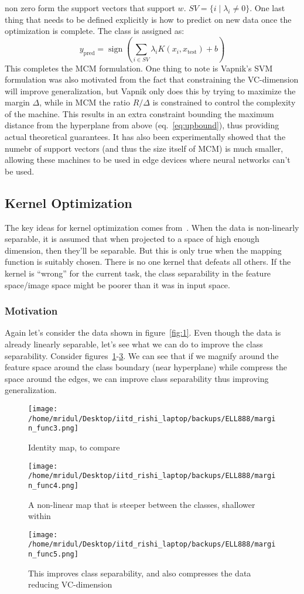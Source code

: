 \documentclass[11pt]{article}
\begin{document}
non zero form the support vectors that support $w$.
$SV=\{i\;\lvert\;\lambda_i\ne 0\}$. One last
thing that needs to be defined explicitly is how to predict on new data once the
optimization is complete. The class is assigned as:
\[y_{\text{pred}}=\operatorname{sign}\left(\sum_{i\in
SV}\lambda_iK(x_i,x_{\text{test}})+b\right)\]
This completes the MCM formulation. One thing to note is Vapnik's SVM
formulation was also motivated from the fact that constraining the VC-dimension
will improve generalization, but Vapnik only does this by trying to maximize the
margin $\Delta$, while in MCM the ratio $R/\Delta$ is constrained to control the
complexity of the machine. This results in an extra constraint bounding the
maximum distance from the hyperplane from above (eq.~\ref{eq:upbound}), thus
providing actual theoretical guarantees. It has also been experimentally showed
that the numebr of support vectors (and thus the size itself of MCM) is much
smaller, allowing these machines to be used in edge devices where neural
networks can't be used.
\subsection{Kernel Optimization}
The key ideas for kernel optimization comes from~\cite{amari}. When the data is
non-linearly separable, it is assumed that when projected to a space of high
enough dimension, then they'll be separable. But this is only true when the
mapping function is suitably chosen. There is no one kernel that defeats all
others. If the kernel is ``wrong'' for the current task, the class separability
in the feature space/image space might be poorer than it was in input space.
\subsubsection{Motivation}
Again let's consider the data shown in figure~\ref{fig:1}. Even though the data
is already linearly separable, let's see what we can do to improve the class
separability. Consider figures~\ref{fig:3}-\ref{fig:5}. We can see that if we
magnify around the feature space around the class boundary (near hyperplane)
while compress the space around the edges, we can improve class separability
thus improving generalization.
\begin{figure}[!htbp]
    \centering
    \texttt{[image: /home/mridul/Desktop/iitd\_rishi\_laptop/backups/ELL888/margin\_func3.png]}
    \caption{\label{fig:3}Identity map, to compare}
\end{figure}
\begin{figure}[!htbp]
    \centering
    \texttt{[image: /home/mridul/Desktop/iitd\_rishi\_laptop/backups/ELL888/margin\_func4.png]}
    \caption{\label{fig:4}A non-linear map that is steeper between the classes,
    shallower within}
\end{figure}
\begin{figure}[!htbp]
    \centering
    \texttt{[image: /home/mridul/Desktop/iitd\_rishi\_laptop/backups/ELL888/margin\_func5.png]}
    \caption{\label{fig:5}This improves class separability, and also compresses
    the data reducing VC-dimension}
\end{figure}
\end{document}
